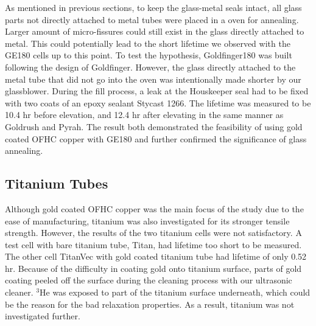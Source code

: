 As mentioned in previous sections, to keep the glass-metal seals intact, all glass parts not directly attached to metal tubes were placed in a oven for annealing. Larger amount of micro-fissures could still exist in the glass directly attached to metal. This could potentially lead to the short lifetime we observed with the GE180 cells up to this point. To test the hypothesis, Goldfinger180 was built following the design of Goldfinger. However, the glass directly attached to the metal tube that did not go into the oven was intentionally made shorter by our glassblower. During the fill process, a leak at the Houskeeper seal had to be fixed with two coats of an epoxy sealant Stycast 1266. The lifetime was measured to be 10.4 hr before elevation, and 12.4 hr after elevating in the same manner as Goldrush and Pyrah. The result both demonstrated the feasibility of using gold coated OFHC copper with GE180 and further confirmed the significance of glass annealing.

\subsection{Titanium Tubes}

Although gold coated OFHC copper was the main focus of the study due to the ease of manufacturing, titanium was also investigated for its stronger tensile strength. However, the results of the two titanium cells were not satisfactory. A test cell with bare titanium tube, Titan, had lifetime too short to be measured. The other cell TitanVec with gold coated titanium tube had lifetime of only 0.52 hr. Because of the difficulty in coating gold onto titanium surface, parts of gold coating peeled off the surface during the cleaning process with our ultrasonic cleaner. $^{3}$He was exposed to part of the titanium surface underneath, which could be the reason for the bad relaxation properties. As a result, titanium was not investigated further.





